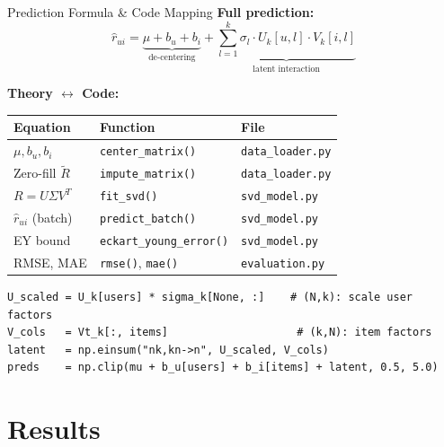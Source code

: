 \documentclass[10pt,t]{beamer}
\begin{document}
\begin{frame}[fragile]{Prediction Formula \& Code Mapping}
  \textbf{Full prediction:}
  \[
    \hat{r}_{ui}
    = \underbrace{\mu+b_u+b_i}_{\text{de-centering}}
    + \underbrace{\sum_{l=1}^k \sigma_l \cdot U_k[u,l]\cdot V_k[i,l]}_{\text{latent interaction}}
  \]

  \textbf{Theory $\leftrightarrow$ Code:}
  \begin{center}
  \scriptsize
  \begin{tabular}{lll}
    \toprule
    \textbf{Equation} & \textbf{Function} & \textbf{File} \\
    \midrule
    $\mu, b_u, b_i$ & \texttt{center\_matrix()} & \texttt{data\_loader.py} \\
    Zero-fill $\tilde{R}$ & \texttt{impute\_matrix()} & \texttt{data\_loader.py} \\
    $R = U\Sigma V^T$ & \texttt{fit\_svd()} & \texttt{svd\_model.py} \\
    $\hat{r}_{ui}$ (batch) & \texttt{predict\_batch()} & \texttt{svd\_model.py} \\
    EY bound & \texttt{eckart\_young\_error()} & \texttt{svd\_model.py} \\
    RMSE, MAE & \texttt{rmse()}, \texttt{mae()} & \texttt{evaluation.py} \\
    \bottomrule
  \end{tabular}
  \end{center}

\begin{lstlisting}
U_scaled = U_k[users] * sigma_k[None, :]    # (N,k): scale user factors
V_cols   = Vt_k[:, items]                    # (k,N): item factors
latent   = np.einsum("nk,kn->n", U_scaled, V_cols)
preds    = np.clip(mu + b_u[users] + b_i[items] + latent, 0.5, 5.0)
\end{lstlisting}
\end{frame}

\section{Results}
\end{document}
